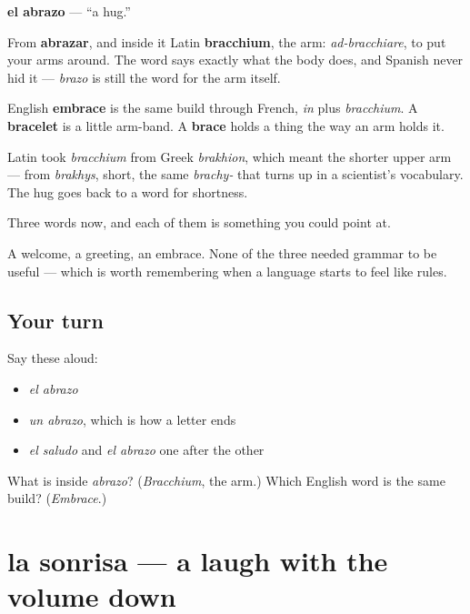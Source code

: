 \begin{cousinweb}
\textbf{el abrazo} — \textquotedblleft{}a hug.\textquotedblright{}

From \textbf{abrazar}, and inside it Latin \textbf{bracchium}, the arm: \emph{ad-bracchiare}, to put your arms around. The word says exactly what the body does, and Spanish never hid it — \emph{brazo} is still the word for the arm itself.

English \textbf{embrace} is the same build through French, \emph{in} plus \emph{bracchium}. A \textbf{bracelet} is a little arm-band. A \textbf{brace} holds a thing the way an arm holds it.

Latin took \emph{bracchium} from Greek \emph{brakhion}, which meant the shorter upper arm — from \emph{brakhys}, short, the same \emph{brachy-} that turns up in a scientist's vocabulary. The hug goes back to a word for shortness.
\end{cousinweb}

\begin{grammarlens}[title={What you've built}]
Three words now, and each of them is something you could point at.

A welcome, a greeting, an embrace. None of the three needed grammar to be useful — which is worth remembering when a language starts to feel like rules.
\end{grammarlens}

\subsection*{Your turn}
Say these aloud:

\begin{itemize}
\raggedright
  \item \emph{el abrazo}
  \item \emph{un abrazo}, which is how a letter ends
  \item \emph{el saludo} and \emph{el abrazo} one after the other
\end{itemize}

\begin{tcolorbox}[breakable,colback=teal!4,colframe=teal!35!black,title={Before you move on}]
What is inside \emph{abrazo}? (\emph{Bracchium}, the arm.) Which English word is the same build? (\emph{Embrace}.)
\end{tcolorbox}
\section[la sonrisa]{la sonrisa — a laugh with the volume down}

